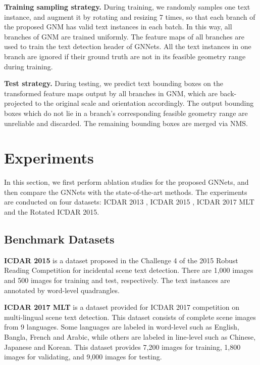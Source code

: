\documentclass[10pt,twocolumn,letterpaper]{article}
\begin{document}
\textbf{Training sampling strategy.} During training, we randomly samples one text instance, and augment it by rotating and resizing 7 times, so that each branch of the proposed GNM
has valid text instances in each batch. In this way, all branches of GNM are trained uniformly. The feature maps of all branches are used to train the text detection header of GNNets.
All the text instances in one branch  are ignored if their ground truth are not in its feasible geometry range during training.

\textbf{Test strategy.} During testing, we predict text bounding boxes on the transformed feature maps output by all branches in GNM, which are back-projected to the original scale and orientation accordingly. The output bounding boxes which do not lie in a branch's corresponding feasible geometry range  are unreliable and discarded. The remaining bounding boxes are merged via NMS.













\section{Experiments}
\label{sec:sec_exp}
In this section, we first perform ablation studies for the proposed GNNets, and then compare the GNNets with  the state-of-the-art methods. The experiments are conducted on four datasets: ICDAR 2013 \cite{karatzas2013icdar}, ICDAR 2015 \cite{karatzas2015icdar}, ICDAR 2017 MLT \cite{nayef2017icdar2017} and the Rotated ICDAR 2015.





\subsection{Benchmark Datasets}
\label{Sec:benchmark}
\textbf{ICDAR 2015} is a dataset proposed in the Challenge 4 of the 2015 Robust Reading Competition for incidental scene text detection. There are 1,000 images and 500 images for training and test, respectively. The text instances are annotated by word-level quadrangles.


\textbf{ICDAR 2017 MLT} is a dataset provided for ICDAR 2017 competition on multi-lingual scene text detection. This dataset consists of complete scene images from 9 languages. Some languages are labeled in word-level such as English, Bangla, French and Arabic, while others are labeled in line-level such as Chinese, Japanese and Korean. This dataset provides 7,200 images for training, 1,800 images for validating, and 9,000 images for testing. 
\end{document}
